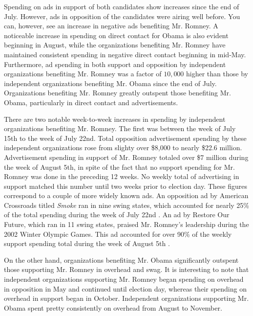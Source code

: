 \documentclass[11pt]{article}\usepackage{graphicx, color}
\begin{document}
Spending on ads in support of both candidates show increases since the end of July. However, ads in opposition of the candidates were airing well before. You can, however, see an increase in negative ads benefiting Mr. Romney. A noticeable increase in spending on direct contact for Obama is also evident beginning in August, while the organizations benefiting Mr. Romney have maintained consistent spending in negative direct contact beginning in mid-May. Furthermore, ad spending in both support and opposition by independent organizations benefiting Mr. Romney was a factor of $10,000$ higher than those by independent organizations benefiting Mr. Obama since the end of July. Organizations benefiting Mr. Romney greatly outspent those benefiting Mr. Obama, particularly in direct contact and advertisements.

There are two notable week-to-week increases in spending by independent organizations benefiting Mr. Romney. The first was between the week of July 15th to the week of July 22nd. Total opposition advertisement spending by these independent organizations rose from slighty over \$8,000 to nearly \$22.6 million. Advertisement spending in support of Mr. Romney totaled over \$7 million during the week of August 5th, in spite of the fact that no support spending for Mr. Romney was done in the preceding 12 weeks. No weekly total of advertising in support matched this number until two weeks prior to election day. These figures correspond to a couple of more widely known ads. An opposition ad by American Crossroads titled \textit{Smoke} ran in nine swing states, which accounted for nearly 25\% of the total spending during the week of July 22nd \cite{kw-crossroads}. An ad by Restore Our Future, which ran in 11 swing states, praised Mr. Romney's leadership during the 2002 Winter Olympic Games. This ad accounted for over 90\% of the weekly support spending total during the week of August 5th \cite{ap-restore}.

On the other hand, organizations benefiting Mr. Obama significantly outspent those supporting Mr. Romney in overhead and swag. It is interesting to note that independent organizations supporting Mr. Romney began spending on overhead in opposition in May and continued until election day, whereas their spending on overhead in support began in October. Independent organizations supporting Mr. Obama spent pretty consistently on overhead from August to November.
\end{document}
